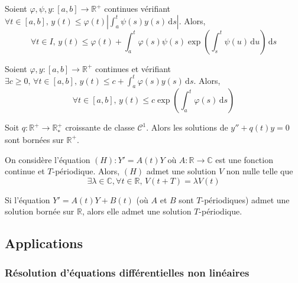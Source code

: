 
  \begin{lemma}[Grönwall]
    Soient $\varphi, \psi, y : [a,b] \rightarrow \mathbb{R}^+$ continues vérifiant $\forall t \in [a,b], \, y(t) \leq \varphi(t) \left | \int_a^t \psi(s) y(s) \, \mathrm{d}s \right |$. Alors,
    \[ \forall t \in I, \, y(t) \leq \varphi(t) + \int_a^t \varphi(s) \psi(s) \exp \left( \int_s^t \psi(u) \, \mathrm{d}u \right) \, \mathrm{d}s \]
  \end{lemma}

  \begin{corollary}
    Soient $\varphi, y : [a,b] \rightarrow \mathbb{R}^+$  continues et vérifiant $\exists c \geq 0, \, \forall t \in [a, b], \, y(t) \leq c + \int_a^t \varphi(s) y(s) \, \mathrm{d}s$. Alors,
    \[ \forall t \in [a,b], \, y(t) \leq c \exp \left( \int_a^t \varphi(s) \, \mathrm{d}s \right) \]
  \end{corollary}

  \begin{application}
    Soit $q : \mathbb{R}^+ \rightarrow \mathbb{R}^+_*$ croissante de classe $\mathcal{C}^1$. Alors les solutions de $y'' + q(t) y = 0$ sont bornées sur $\mathbb{R}^+$.
  \end{application}


  \begin{theorem}[Floquet]
    On considère l'équation $(H) : Y' = A(t) Y$ où $A : \mathbb{R} \rightarrow \mathbb{C}$ est une fonction continue et $T$-périodique. Alors, $(H)$ admet une solution $V$ non nulle telle que
    \[ \exists \lambda \in \mathbb{C}, \forall t \in \mathbb{R}, \, V(t+T) = \lambda V(t) \]
  \end{theorem}


  \begin{theorem}[Massera]
    Si l'équation $Y' = A(t) Y + B(t)$ (où $A$ et $B$ sont $T$-périodiques) admet une solution bornée sur $\mathbb{R}$, alors elle admet une solution $T$-périodique.
  \end{theorem}

  \subsection{Applications}

  \subsubsection{Résolution d'équations différentielles non linéaires}

